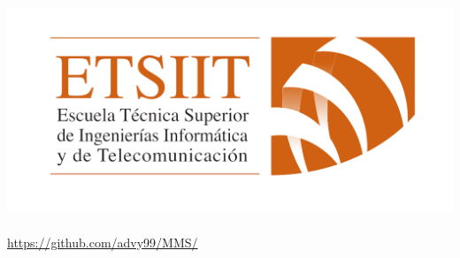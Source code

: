 \documentclass[12pt, spanish]{article}
\makeatletter
\let\thedate\@date
\makeatother
\begin{document}
\begin{titlepage}
	 \includegraphics[scale = 0.20]{logo_etsiit.png}\\[0.3 cm]
    {\large \thedate}\\[0.75cm]
	 \url{https://github.com/advy99/MMS/}\\[0.75cm]
    \doclicenseThis
\end{titlepage}



\pagestyle{fancy}




\tableofcontents
\pagebreak








\end{document}
